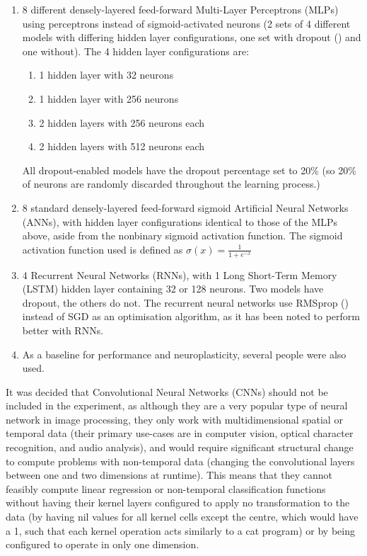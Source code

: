\documentclass[]{report}
\begin{document}
\begin{enumerate}
	\item 8 different densely-layered feed-forward Multi-Layer Perceptrons (MLPs) using perceptrons instead of sigmoid-activated neurons (2 sets of 4 different models with differing hidden layer configurations, one set with dropout (\cite{dropout14}) and one without).
	\newline
	The 4 hidden layer configurations are:
	\begin{enumerate}
		\item 1 hidden layer with 32 neurons
		\item 1 hidden layer with 256 neurons
		\item 2 hidden layers with 256 neurons each
		\item 2 hidden layers with 512 neurons each
	\end{enumerate}
	All dropout-enabled models have the dropout percentage set to 20\% (so 20\% of neurons are randomly discarded throughout the learning process.)
	\item 8 standard densely-layered feed-forward sigmoid Artificial Neural Networks (ANNs), with hidden layer configurations identical to those of the MLPs above, aside from the nonbinary sigmoid activation function.
	\newline
	The sigmoid activation function used is defined as \(\sigma(x) = \frac{1}{1+e^{-x}}\)
	\item 4 Recurrent Neural Networks (RNNs), with 1 Long Short-Term Memory (LSTM) hidden layer containing 32 or 128 neurons. Two models have dropout, the others do not.
	\newline
	The recurrent neural networks use RMSprop (\cite{hinton2012neural}) instead of SGD as an optimisation algorithm, as it has been noted to perform better with RNNs.
	\item As a baseline for performance and neuroplasticity, several people were also used.
\end{enumerate}

It was decided that Convolutional Neural Networks (CNNs) should not be included in the experiment, as although they are a very popular type of neural network in image processing, they only work with multidimensional spatial or temporal data (their primary use-cases are in computer vision, optical character recognition, and audio analysis), and would require significant structural change to compute problems with non-temporal data (changing the convolutional layers between one and two dimensions at runtime). This means that they cannot feasibly compute linear regression or non-temporal classification functions without having their kernel layers configured to apply no transformation to the data (by having nil values for all kernel cells except the centre, which would have a 1, such that each kernel operation acts similarly to a cat program) or by being configured to operate in only one dimension.
\end{document}
